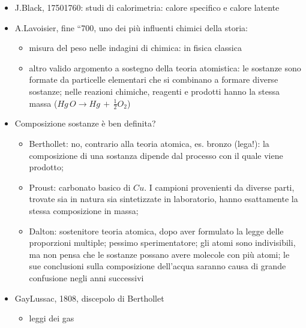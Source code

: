 \documentclass[letterpaper,10pt,italian]{jupyterBook}
\begin{document}
\begin{itemize}
\item {} 
\sphinxAtStartPar
J.Black, 1750\sphinxhyphen{}1760: studi di calorimetria: calore specifico e calore latente

\item {} 
\sphinxAtStartPar
A.Lavoisier, fine “700, uno dei più influenti chimici della storia:
\begin{itemize}
\item {} 
\sphinxAtStartPar
misura del peso nelle indagini di chimica:  in fisica classica

\item {} 
\sphinxAtStartPar
altro valido argomento a sostegno della teoria atomistica: le sostanze sono formate da particelle elementari che si combinano a formare diverse sostanze; nelle reazioni chimiche, reagenti e prodotti hanno la stessa massa (\(Hg \, O \rightarrow Hg \, + \, \frac{1}{2} O_2\))

\end{itemize}

\item {} 
\sphinxAtStartPar
Composizione sostanze è ben definita?
\begin{itemize}
\item {} 
\sphinxAtStartPar
Berthollet: no, contrario alla teoria atomica, es. bronzo (lega!): la composizione di una sostanza dipende dal processo con il quale viene prodotto;

\item {} 
\sphinxAtStartPar
Proust: carbonato basico di \(Cu\). I campioni provenienti da diverse parti, trovate sia in natura sia sintetizzate in laboratorio, hanno esattamente la stessa composizione in massa;

\item {} 
\sphinxAtStartPar
Dalton: sostenitore teoria atomica, dopo aver formulato la legge delle proporzioni multiple; pessimo sperimentatore; gli atomi sono indivisibili, ma non pensa che le sostanze possano avere molecole con più atomi; le sue conclusioni sulla composizione dell’acqua saranno causa di grande confusione negli anni successivi

\end{itemize}

\item {} 
\sphinxAtStartPar
Gay\sphinxhyphen{}Lussac, 1808, discepolo di Berthollet
\begin{itemize}
\item {} 
\sphinxAtStartPar
leggi dei gas


\end{itemize}
\end{itemize}
\end{document}
